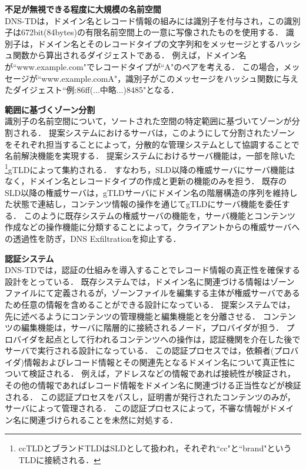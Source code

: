 \textbf{不足が無視できる程度に大規模の名前空間}\\
DNS-TDは，ドメイン名とレコード情報の組みには識別子を付与され，この識別子は672bit(84bytes)の有限名前空間上の一意に写像されたものを使用する．
識別子は，ドメイン名とそのレコードタイプの文字列和をメッセージとするハッシュ関数から算出されるダイジェストである．
例えば，ドメイン名が``www.example.com"でレコードタイプが``A"のペアを考える．
この場合，メッセージが``www.example.comA"，識別子がこのメッセージをハッシュ関数に与えたダイジェスト``例:86ff(...中略...)8485"となる．\newline

\textbf{範囲に基づくゾーン分割}\\
識別子の名前空間について，ソートされた空間の特定範囲に基づいてゾーンが分割される．
提案システムにおけるサーバは，このようにして分割されたゾーンをそれぞれ担当することによって，分散的な管理システムとして協調することで名前解決機能を実現する．
提案システムにおけるサーバ機能は，一部を除いた\footnote{ccTLDとブランドTLDはSLDとして扱われ，それぞれ``cc"と``brand"というTLDに接続される．}gTLDによって集約される．
すなわち，SLD以降の権威サーバにサーバ機能はなく，ドメイン名とレコードタイプの作成と更新の機能のみを担う．
既存のSLD以降の権威サーバは，gTLDサーバにドメイン名の階層構造の序列を維持した状態で連結し，コンテンツ情報の操作を通じてgTLDにサーバ機能を委任する．
このように既存システムの権威サーバの機能を，サーバ機能とコンテンツ作成などの操作機能に分類することによって，クライアントからの権威サーバへの透過性を防ぎ，DNS Exfiltrationを抑止する．\newline

\textbf{認証システム}\\
DNS-TDでは，認証の仕組みを導入することでレコード情報の真正性を確保する設計をとっている．
既存システムでは，ドメイン名に関連づける情報はゾーンファイルにて定義されるが，ゾーンファイルを編集する主体が権威サーバであるため任意の情報を含めることができる設計になっている．
提案システムでは，先に述べるようにコンテンツの管理機能と編集機能とを分離させる．
コンテンツの編集機能は，サーバに階層的に接続されるノード，プロバイダが担う．
プロバイダを起点として行われるコンテンツへの操作は，認証機関を介在した後でサーバで実行される設計になっている．
この認証プロセスでは，依頼者(プロバイダ)情報およびレコード情報とその関連先となるドメイン名について真正性について検証される．
例えば，アドレスなどの情報であれば接続性が検証され，その他の情報であればレコード情報をドメイン名に関連づける正当性などが検証される．
この認証プロセスをパスし，証明書が発行されたコンテンツのみが，サーバによって管理される．
この認証プロセスによって，不審な情報がドメイン名に関連づけられることを未然に対処する．


